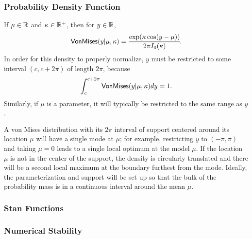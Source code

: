 \subsubsection{Probability Density Function}

If $\mu \in \reals$ and $\kappa \in \posreals$, then for $y \in
\reals$,
%
\[
\distro{VonMises}(y|\mu,\kappa)
=
\frac{\exp(\kappa\cos(y-\mu))}{2\pi I_0(\kappa)}
\!.
\]
%
In order for this density to properly normalize, $y$ must be
restricted to some interval  $(c, c + 2\pi)$ of length $2 \pi$,
because
%
\[
\int_{c}^{c + 2\pi} \distro{VonMises}(y|\mu,\kappa) dy
= 1.
\]
%
Similarly, if $\mu$ is a parameter, it will typically be restricted to
the same range as $y$.  

A von Mises distribution with its $2 \pi$ interval of support centered
around its location $\mu$ will have a single mode at $\mu$; for
example, restricting $y$ to $(-\pi,\pi)$ and taking $\mu = 0$ leads to
a single local optimum at the model $\mu$.  If the location $\mu$ is
not in the center of the support, the density is circularly translated
and there will be a second local maximum at the boundary furthest from
the mode.  Ideally, the parameterization and support will be set up so
that the bulk of the probability mass is in a continuous interval
around the mean $\mu$.


\subsubsection{Stan Functions}

\begin{description}
\end{description}

\begin{description}
\end{description}
\subsubsection{Numerical Stability}

